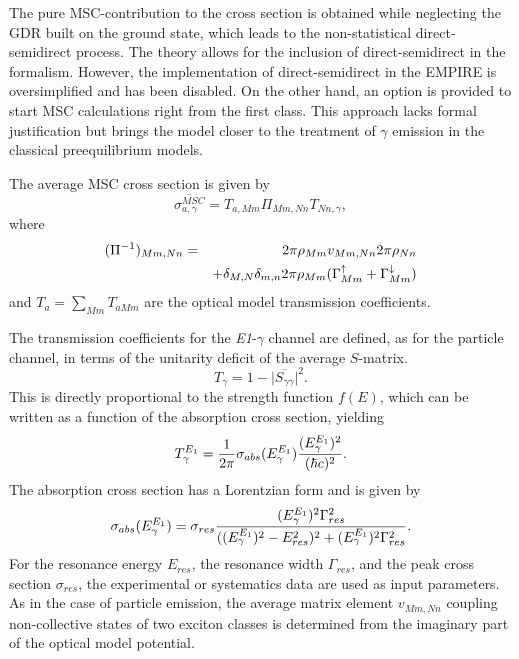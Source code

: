 The pure MSC-contribution to the cross section is obtained while neglecting
the GDR built on the ground state, which leads to the non-statistical
direct-semidirect process. The theory \cite{GammaMSC} allows for the
inclusion of direct-semidirect in the formalism. However, the implementation
of direct-semidirect in the EMPIRE is oversimplified and has been disabled.
On the other hand, an option is provided to start MSC%
 calculations right from the first class. This approach lacks
formal justification but brings the model closer to the treatment of $\gamma$
emission in the classical preequilibrium models.

The average MSC cross section is given by
\begin{equation}
\overline{\sigma_{a,\gamma}^{MSC}}=T_{a,Mm}\Pi_{Mm,Nn}T_{Nn,\gamma},
\label{GammaMSCxs}
\end{equation}
where
\begin{eqnarray}
(\Pi^{-1})_{Mm,Nn} & = & 2\pi\rho_{Mm}v_{Mm,Nn}2\pi\rho_{Nn}  \notag \\
& &
+\delta_{M,N}\delta_{m,n}2\pi\rho_{Mm}(\Gamma_{Mm}^{\uparrow}+\Gamma_{Mm}^{%
\downarrow})  \label{Pigamma}
\end{eqnarray}
and $T_{a}=\sum_{Mm}T_{aMm}$ are the optical model transmission coefficients.

The transmission coefficients for the \emph{E1}-$\gamma$ channel are
defined, as for the particle channel, in terms of the unitarity deficit of
the average $S$-matrix.
\begin{equation}
T_{\gamma}=1-\Big|\overline{S_{\gamma\gamma}}\Big|^{2}.
\end{equation}
This is directly proportional to the strength function $f(E)$, which can be
written as a function of the absorption cross section, yielding
\begin{equation}
T_{\gamma}^{E_{1}}=\frac{1}{2\pi}\sigma_{abs}(E_{\gamma}^{E_{1}})\frac{%
(E_{\gamma}^{E_{1}})^{2}}{(\hbar c)^{2}}.
\end{equation}
The absorption cross section has a Lorentzian form and is given by
\begin{equation}
\sigma_{abs}(E_{\gamma}^{E_{1}})=\sigma_{res}\frac{(E_{\gamma}^{E_{1}})^{2}%
\Gamma_{res}^{2}}{((E_{\gamma}^{E_{1}})^{2}-E_{res}^{2})^{2}+(E_{%
\gamma}^{E_{1}})^{2}\Gamma_{res}^{2}}.
\end{equation}
For the resonance energy $E_{res}$, the resonance width $\Gamma_{res}$, and
the peak cross section $\sigma_{res}$, the experimental or systematics data
are used as input parameters. As in the case of particle emission, the
average matrix element $v_{Mm,Nn}$ coupling non-collective states of two
exciton classes is determined from the imaginary part of the optical model
potential.

